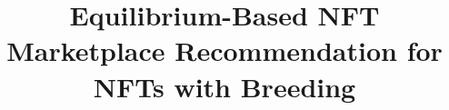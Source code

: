 \documentclass[conference]{IEEEtran}
\theoremstyle{plain}
\begin{document}
\title{Equilibrium-Based NFT Marketplace Recommendation for NFTs with Breeding}

\author{}



% 
\end{document}
